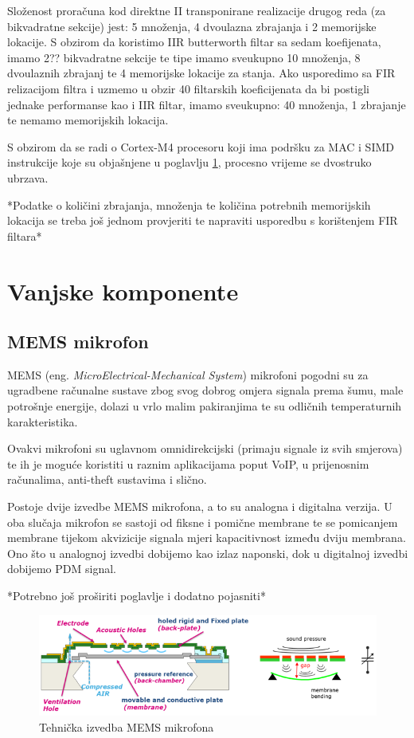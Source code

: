 \documentclass[times, utf8, diplomski]{fer}
\begin{document}
Složenost proračuna kod direktne II transponirane realizacije drugog reda (za bikvadratne sekcije) jest: 5 množenja, 4 dvoulazna zbrajanja i 2 memorijske lokacije. S obzirom da koristimo IIR butterworth filtar sa sedam koefijenata, imamo 2?? bikvadratne sekcije te tipe imamo sveukupno 10 množenja, 8 dvoulaznih zbrajanj te 4 memorijske lokacije za stanja. Ako usporedimo sa FIR relizacijom filtra i uzmemo u obzir 40 filtarskih koeficijenata da bi postigli jednake performanse kao i IIR filtar, imamo sveukupno: 40 množenja, 1 zbrajanje te nemamo memorijskih lokacija.


S obzirom da se radi o Cortex-M4 procesoru koji ima podršku za MAC i SIMD instrukcije koje su objašnjene u poglavlju \ref{SIMD}, procesno vrijeme se dvostruko ubrzava.

*Podatke o količini zbrajanja, množenja te količina potrebnih memorijskih lokacija se treba još jednom provjeriti te napraviti usporedbu s korištenjem FIR filtara*
\section{Vanjske komponente}
\subsection{MEMS mikrofon}
MEMS (eng. \textit{MicroElectrical-Mechanical System}) mikrofoni pogodni su za ugradbene računalne sustave zbog svog dobrog omjera signala prema šumu, male potrošnje energije, dolazi u vrlo malim pakiranjima te su odličnih temperaturnih karakteristika.

Ovakvi mikrofoni su uglavnom omnidirekcijski (primaju signale iz svih smjerova) te ih je moguće koristiti u raznim aplikacijama poput VoIP, u prijenosnim računalima, anti-theft sustavima i slično.

Postoje dvije izvedbe MEMS mikrofona, a to su analogna i digitalna verzija. U oba slučaja mikrofon se sastoji od fiksne i pomične membrane te se pomicanjem membrane tijekom akvizicije signala mjeri kapacitivnost između dviju membrana. Ono što u analognoj izvedbi dobijemo kao izlaz naponski, dok u digitalnoj izvedbi dobijemo PDM signal.

*Potrebno još proširiti poglavlje i dodatno pojasniti*

\begin{figure}[hbt!]
 \centering
 \includegraphics[scale=0.8]{photos/gradjamems.png}
 \caption{Tehnička izvedba MEMS mikrofona}
 \label{SIMD}
\end{figure}
\end{document}
